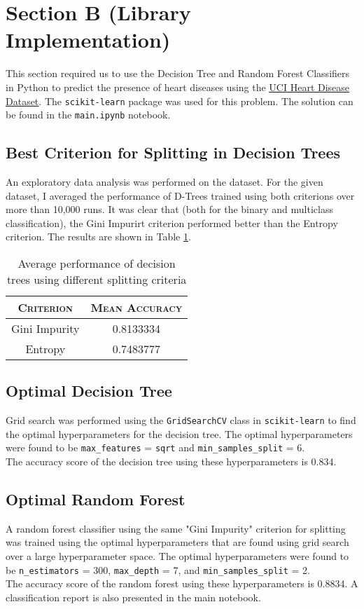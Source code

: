 \documentclass[12pt]{article}
\begin{document}
    \section{Section B (Library Implementation)}
    This section required us to use the Decision Tree and Random Forest Classifiers in Python to predict
    the presence of heart diseases using the \href{https://archive.ics.uci.edu/dataset/45/heart+disease}{\color{blue}\underline{UCI Heart Disease Dataset}}.
    The \texttt{scikit-learn} package was used for this problem. The solution can be found in the
    \texttt{main.ipynb} notebook.

    \subsection*{Best Criterion for Splitting in Decision Trees}
    An exploratory data analysis was performed on the dataset. For the given dataset, I averaged the performance of
    D-Trees trained using both criterions over more than 10,000 runs.
    It was clear that (both for the binary and multiclass classification), the Gini Impurirt criterion performed better than the Entropy criterion.
    The results are shown in Table \ref{tab:split}.
    \begin{table}[htbp]
        \centering
        \begin{tabular}{c|c}
            \textsc{Criterion} & \textsc{Mean Accuracy} \\
            \hline
            Gini Impurity & 0.8133334 \\
            Entropy & 0.7483777
        \end{tabular}
        \caption{Average performance of decision trees using different splitting criteria}
        \label{tab:split}
    \end{table}

    \subsection*{Optimal Decision Tree}
    Grid search was performed using the \texttt{GridSearchCV} class in \texttt{scikit-learn} to find the optimal
    hyperparameters for the decision tree. The optimal hyperparameters were found to be \texttt{max\_features} = \texttt{sqrt}
    and \texttt{min\_samples\_split} = 6. \\
    The accuracy score of the decision tree using these hyperparameters is 0.834.

    \subsection*{Optimal Random Forest}
    A random forest classifier using the same "Gini Impurity" criterion for splitting was trained
    using the optimal hyperparameters that are found using grid search over a large hyperparameter
    space. The optimal hyperparameters were found to be \texttt{n\_estimators} = 300, \texttt{max\_depth} = 7,
    and \texttt{min\_samples\_split} = 2. \\
    The accuracy score of the random forest using these hyperparameters is 0.8834. A classification
    report is also presented in the main notebook.
\end{document}

